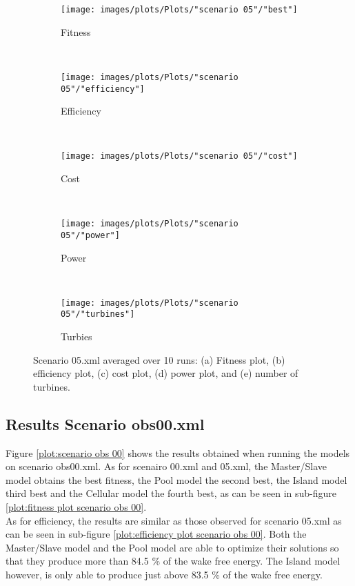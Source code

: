 \begin{figure}[h!]
    \centering
      \begin{subfigure}[b]{0.45\textwidth}
        \texttt{[image: images/plots/Plots/"scenario 05"/"best"]}
        \caption{Fitness}
        \hfill
        \label{plot:fitness plot scenario 05}
    \end{subfigure}
    ~
      \begin{subfigure}[b]{0.45\textwidth}
        \texttt{[image: images/plots/Plots/"scenario 05"/"efficiency"]}
        \caption{Efficiency}
        \hfill
        \label{plot:efficiency plot scenario 05}
    \end{subfigure}
    ~
    \begin{subfigure}[b]{0.45\textwidth}
        \texttt{[image: images/plots/Plots/"scenario 05"/"cost"]}
        \caption{Cost}
        \hfill
        \label{plot:cost plot scenario 05}
    \end{subfigure}
    ~
    \begin{subfigure}[b]{0.45\textwidth}
        \texttt{[image: images/plots/Plots/"scenario 05"/"power"]}
        \caption{Power}
        \hfill
        \label{plot:power plot scenario 05}
    \end{subfigure}
    ~
    \begin{subfigure}[b]{0.45\textwidth}
        \texttt{[image: images/plots/Plots/"scenario 05"/"turbines"]}
        \caption{Turbies}
        \hfill
        \label{plot:turbines plot scenario 05}
    \end{subfigure}
    \caption{Scenario 05.xml averaged over 10 runs: (a) Fitness plot, (b) efficiency plot, (c) cost plot, (d) power plot, and (e) number of turbines.}
    \label{plot:scenario 05}
\end{figure}


\subsection{Results Scenario obs00.xml}
Figure \ref{plot:scenario obs 00} shows the results obtained when running the models on scenario obs00.xml. As for scenairo 00.xml and 05.xml, the Master/Slave model obtains the best fitness, the Pool model the second best, the Island model third best and the Cellular model the fourth best, as can be seen in sub-figure \ref{plot:fitness plot scenario obs 00}.\\


\noindent As for efficiency, the results are similar as those observed for scenario 05.xml as can be seen in sub-figure \ref{plot:efficiency plot scenario obs 00}. Both the Master/Slave model and the Pool model are able to optimize their solutions so that they produce more than 84.5 \% of the wake free energy. The Island model however, is only able to produce just above 83.5 \% of the wake free energy.\\


